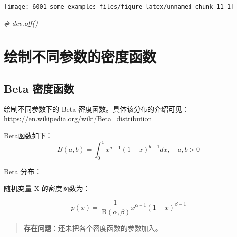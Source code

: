 \documentclass[
]{book}
\newenvironment{Shaded}{\begin{snugshade}}{\end{snugshade}}
\newcommand{\CommentTok}[1]{\textcolor[rgb]{0.56,0.35,0.01}{\textit{#1}}}
\begin{document}
\begin{center}\texttt{[image: 6001-some-examples\_files/figure-latex/unnamed-chunk-11-1]} \end{center}

\begin{Shaded}
\begin{Highlighting}[]
\CommentTok{\# dev.off()}
\end{Highlighting}
\end{Shaded}

\hypertarget{ux7ed8ux5236ux4e0dux540cux53c2ux6570ux7684ux5bc6ux5ea6ux51fdux6570}{%
\section{绘制不同参数的密度函数}\label{ux7ed8ux5236ux4e0dux540cux53c2ux6570ux7684ux5bc6ux5ea6ux51fdux6570}}

\hypertarget{beta-ux5bc6ux5ea6ux51fdux6570}{%
\subsection{Beta 密度函数}\label{beta-ux5bc6ux5ea6ux51fdux6570}}

绘制不同参数下的 Beta 密度函数。具体该分布的介绍可见：\url{https://en.wikipedia.org/wiki/Beta_distribution}

Beta函数如下： \[
B(a,b) = \int_{0}^{1} x^{a-1} {(1-x)}^{b-1} dx,\quad a,b>0
\]

Beta 分布：

随机变量 X 的密度函数为：

\[p(x) = \frac{1}{\mathrm{~B}(\alpha, \beta)} x^{\alpha-1}(1-x)^{\beta-1}\]

\begin{quote}
\textbf{存在问题}：还未把各个密度函数的参数加入。
\end{quote}
\end{document}
